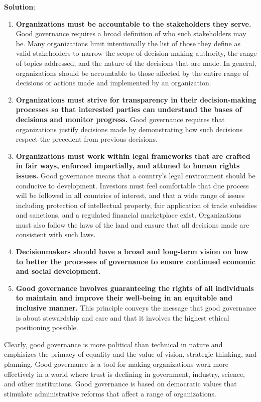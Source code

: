 \documentclass[
  openany]{book}
\newenvironment{solution}{ {\bfseries Solution}:}{}
\begin{document}
\begin{questions}
\begin{solution}
\begin{enumerate}
\item \textbf{Organizations must be accountable to the stakeholders they serve.} Good governance requires a broad definition of who such stakeholders may be. Many organizations limit intentionally the list of those they define as valid stakeholders to narrow the scope of decision-making authority, the range of topics addressed, and the nature of the decisions that are made. In general, organizations should be accountable to those affected by the entire range of decisions or actions made and implemented by an organization.
\item \textbf{Organizations must strive for transparency in their decision-making processes so that interested parties can understand the bases of decisions and monitor progress.} Good governance requires that organizations justify decisions made by demonstrating how such decisions respect the precedent from previous decisions.
\item \textbf{Organizations must work within legal frameworks that are crafted in fair ways, enforced impartially, and attuned to human rights issues.} Good governance means that a country’s legal environment should be conducive to development. Investors must feel comfortable that due process will be followed in all countries of interest, and that a wide range of issues including protection of intellectual property, fair application of trade subsidies and sanctions, and a regulated financial marketplace exist. Organizations must also follow the laws of the land and ensure that all decisions made are consistent with such laws.
\item \textbf{Decisionmakers should have a broad and long-term vision on how to better the processes of governance to ensure continued economic and social development.}
\item \textbf{Good governance involves guaranteeing the rights of all individuals to maintain and improve their well-being in an equitable and inclusive manner.} This principle conveys the message that good governance is about stewardship and care and that it involves the highest ethical positioning possible.
\end{enumerate}

Clearly, good governance is more political than technical in nature and emphisizes the primacy of equality and the value of vision, strategic thinking, and planning. Good governance is a tool for making organizations work more effectively in a world where trust is declining in government, industry, science, and other institutions. Good governance is based on democratic values that stimulate administrative reforms that affect a range of organizations.


\end{solution}
\end{questions}
\end{document}
